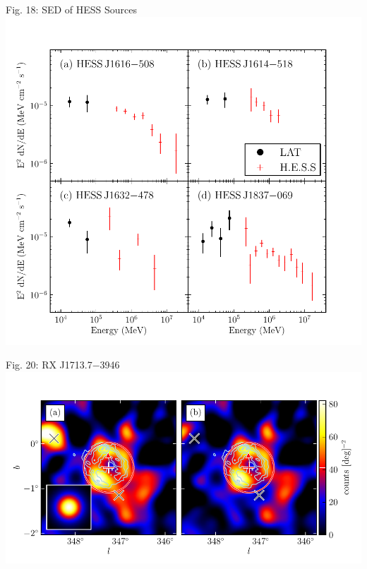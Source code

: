 \documentclass[12pt]{beamer}
\begin{document}
\begin{frame}{Fig. 18: SED of HESS Sources}
  \includegraphics[scale=0.5]{plots/hess_seds_color.pdf}
\end{frame}

\begin{frame}{Fig. 20: RX J1713.7$-$3946}
  \includegraphics[scale=0.5]{plots/source_RX_J1713_7-3946_color.pdf}
\end{frame}
\end{document}
